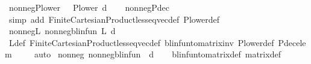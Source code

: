 \begin{isabellebody}
\endisatagproof
{\isafoldproof}%
%
\isadelimproof
\isanewline
%
\endisadelimproof
\isanewline
{}\isamarkupfalse%
\ nonneg{\isacharunderscore}{\kern0pt}P{\isacharunderscore}{\kern0pt}lower{\isacharcolon}{\kern0pt}\ {\isachardoublequoteopen}{}\ {\isasymle}\ P{\isacharunderscore}{\kern0pt}lower\ d{\isachardoublequoteclose}\isanewline
%
\isadelimproof
\ \ %
\endisadelimproof
%
\isatagproof
{}\isamarkupfalse%
\ nonneg{\isacharunderscore}{\kern0pt}P{\isacharunderscore}{\kern0pt}dec\ \isanewline
\ \ \isamarkupfalse%
\ {\isacharparenleft}{\kern0pt}simp\ add{\isacharcolon}{\kern0pt}\ Finite{\isacharunderscore}{\kern0pt}Cartesian{\isacharunderscore}{\kern0pt}Product{\isachardot}{\kern0pt}less{\isacharunderscore}{\kern0pt}eq{\isacharunderscore}{\kern0pt}vec{\isacharunderscore}{\kern0pt}def\ P{\isacharunderscore}{\kern0pt}lower{\isacharunderscore}{\kern0pt}def{\isacharparenright}{\kern0pt}%
\endisatagproof
{\isafoldproof}%
%
\isadelimproof
\isanewline
%
\endisadelimproof
\isanewline
{}\isamarkupfalse%
\ nonneg{\isacharunderscore}{\kern0pt}{\isasymP}\isactrlsub L{\isacharcolon}{\kern0pt}\ {\isachardoublequoteopen}nonneg{\isacharunderscore}{\kern0pt}blinfun\ {\isacharparenleft}{\kern0pt}{\isasymP}\isactrlsub L\ d{\isacharparenright}{\kern0pt}{\isachardoublequoteclose}\isanewline
%
\isadelimproof
\ \ %
\endisadelimproof
%
\isatagproof
{}\isamarkupfalse%
\ {\isasymP}\isactrlsub L{\isacharunderscore}{\kern0pt}def\ Finite{\isacharunderscore}{\kern0pt}Cartesian{\isacharunderscore}{\kern0pt}Product{\isachardot}{\kern0pt}less{\isacharunderscore}{\kern0pt}eq{\isacharunderscore}{\kern0pt}vec{\isacharunderscore}{\kern0pt}def\ blinfun{\isacharunderscore}{\kern0pt}to{\isacharunderscore}{\kern0pt}matrix{\isacharunderscore}{\kern0pt}inv\ P{\isacharunderscore}{\kern0pt}lower{\isacharunderscore}{\kern0pt}def\ P{\isacharunderscore}{\kern0pt}dec{\isacharunderscore}{\kern0pt}elem\ \isanewline
\ \ \isamarkupfalse%
\ auto%
\endisatagproof
{\isafoldproof}%
%
\isadelimproof
\isanewline
%
\endisadelimproof
\isanewline
{}\isamarkupfalse%
\ nonneg{\isacharunderscore}{\kern0pt}{\isasymP}\ {\isachardoublequoteopen}nonneg{\isacharunderscore}{\kern0pt}blinfun\ {\isacharparenleft}{\kern0pt}{\isasymP}\ d{\isacharparenright}{\kern0pt}{\isachardoublequoteclose}\isanewline
%
\isadelimproof
\ \ %
\endisadelimproof
%
\isatagproof
{}\isamarkupfalse%
\ blinfun{\isacharunderscore}{\kern0pt}to{\isacharunderscore}{\kern0pt}matrix{\isacharunderscore}{\kern0pt}def\ matrix{\isacharunderscore}{\kern0pt}def\isanewline

\end{isabellebody}
